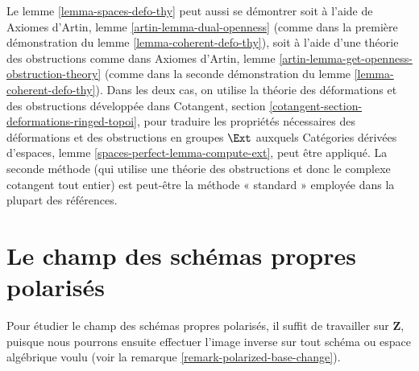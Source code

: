 \begin{remark}
\label{remark-spaces-defo-thy}
Le lemme \ref{lemma-spaces-defo-thy} peut aussi se démontrer soit à l'aide de
Axiomes d'Artin, lemme \ref{artin-lemma-dual-openness}
(comme dans la première démonstration du
lemme \ref{lemma-coherent-defo-thy}), soit à l'aide d'une théorie des
obstructions comme dans Axiomes d'Artin, lemme
\ref{artin-lemma-get-openness-obstruction-theory}
(comme dans la seconde démonstration du
lemme \ref{lemma-coherent-defo-thy}).
Dans les deux cas, on utilise la théorie des déformations et des obstructions
développée dans Cotangent, section
\ref{cotangent-section-deformations-ringed-topoi}, pour traduire les propriétés
nécessaires des déformations et des obstructions en groupes $\Ext$ auxquels
Catégories dérivées d'espaces, lemme
\ref{spaces-perfect-lemma-compute-ext}, peut être appliqué.
La seconde méthode (qui utilise une théorie des obstructions et donc le
complexe cotangent tout entier) est peut-être la méthode « standard » employée
dans la plupart des références.
\end{remark}

\section{Le champ des schémas propres polarisés}
\label{section-polarized}

\noindent
Pour étudier le champ des schémas propres polarisés, il suffit de travailler
sur $\mathbf{Z}$, puisque nous pourrons ensuite effectuer l'image inverse sur
tout schéma ou espace algébrique voulu (voir la remarque
\ref{remark-polarized-base-change}).


